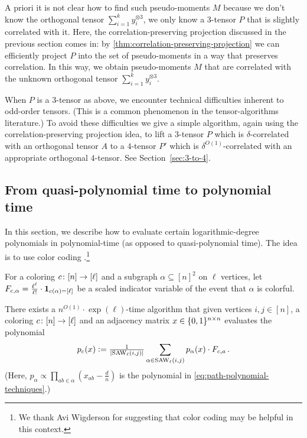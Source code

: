 A priori it is not clear how to find such pseudo-moments $M$ because we don't know the orthogonal tensor $\sum_{i=1}^k y_i^{\otimes 3}$, we only know a 3-tensor $P$ that is slightly correlated with it.
Here, the correlation-preserving projection discussed in the previous section comes in:
by \cref{thm:correlation-preserving-projection} we can efficiently project $P$ into the set of pseudo-moments in a way that preserves correlation.
In this way, we obtain pseudo-moments $M$ that are correlated with the unknown orthogonal tensor $\sum_{i=1}^k y_i^{\otimes 3}$.

When $P$ is a $3$-tensor as above, we encounter technical difficulties inherent to odd-order tensors.
(This is a common phenomenon in the tensor-algorithms literature.)
To avoid these difficulties we give a simple algorithm, again using the correlation-preserving projection idea, to lift a $3$-tensor $P$ which is $\delta$-correlated with an orthogonal tensor $A$ to a $4$-tensor $P'$ which is $\delta^{O(1)}$-correlated with an appropriate orthogonal $4$-tensor.
See Section~\ref{sec:3-to-4}.

\subsection{From quasi-polynomial time to polynomial time}
\label{sec:techniques-color-coding}


In this section, we describe how to evaluate certain logarithmic-degree polynomials in polynomial-time (as opposed to quasi-polynomial time).
The idea is to use color coding \cite{DBLP:journals/jacm/AlonYZ95}.\footnote{We thank Avi Wigderson for suggesting that color coding may be helpful in this context.}

For a coloring $c\colon [n]\to [\ell]$ and a subgraph $\alpha\subseteq [n]^2$ on $\ell$ vertices, let $F_{c,\alpha}=\tfrac {\ell^\ell}{\ell!} \cdot \operatorname{\mathbf 1}_{c(\alpha)=[\ell]}$ be a scaled indicator variable of the event that $\alpha$ is colorful.

\begin{theorem}
  There exists a $n^{O(1)}\cdot \exp(\ell)$-time algorithm that given vertices $i,j\in[n]$, a coloring $c\colon [n]\to [\ell]$ and an adjacency matrix $x\in \{0,1\}^{n\times n}$ evaluates the polynomial
  \begin{equation}
    p_{c}(x) \mathrel{\mathop:}= \tfrac {1}{\lvert\mathrm{SAW}_\ell(i,j)\rvert} \sum_{\alpha\in \mathrm{SAW}_\ell(i,j)} p_\alpha(x) \cdot F_{c,a}\,.
  \end{equation}
  (Here, $p_\alpha\propto \prod_{ab\in \alpha} (x_{ab}-\tfrac dn)$ is the polynomial in \cref{eq:path-polynomial-techniques}.)
\end{theorem}

